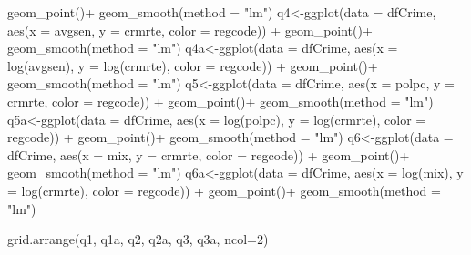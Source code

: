 \documentclass[]{article}
\newenvironment{Shaded}{}{}
\newcommand{\DataTypeTok}[1]{#1}
\newcommand{\DecValTok}[1]{#1}
\newcommand{\KeywordTok}[1]{\textcolor[rgb]{0.00,0.00,1.00}{#1}}
\newcommand{\NormalTok}[1]{#1}
\newcommand{\OperatorTok}[1]{#1}
\newcommand{\StringTok}[1]{\textcolor[rgb]{0.00,0.50,0.50}{#1}}
\begin{document}
\begin{Shaded}
\begin{Highlighting}[]
\StringTok{      }\KeywordTok{geom_point}\NormalTok{()}\OperatorTok{+}
\StringTok{  }\KeywordTok{geom_smooth}\NormalTok{(}\DataTypeTok{method =} \StringTok{"lm"}\NormalTok{)}
\NormalTok{q4<-}\KeywordTok{ggplot}\NormalTok{(}\DataTypeTok{data =}\NormalTok{ dfCrime, }\KeywordTok{aes}\NormalTok{(}\DataTypeTok{x =}\NormalTok{ avgsen, }\DataTypeTok{y =}\NormalTok{ crmrte, }\DataTypeTok{color =}\NormalTok{ regcode)) }\OperatorTok{+}
\StringTok{      }\KeywordTok{geom_point}\NormalTok{()}\OperatorTok{+}
\StringTok{  }\KeywordTok{geom_smooth}\NormalTok{(}\DataTypeTok{method =} \StringTok{"lm"}\NormalTok{)}
\NormalTok{q4a<-}\KeywordTok{ggplot}\NormalTok{(}\DataTypeTok{data =}\NormalTok{ dfCrime, }\KeywordTok{aes}\NormalTok{(}\DataTypeTok{x =} \KeywordTok{log}\NormalTok{(avgsen), }\DataTypeTok{y =} \KeywordTok{log}\NormalTok{(crmrte), }\DataTypeTok{color =}\NormalTok{ regcode)) }\OperatorTok{+}
\StringTok{      }\KeywordTok{geom_point}\NormalTok{()}\OperatorTok{+}
\StringTok{  }\KeywordTok{geom_smooth}\NormalTok{(}\DataTypeTok{method =} \StringTok{"lm"}\NormalTok{)}
\NormalTok{q5<-}\KeywordTok{ggplot}\NormalTok{(}\DataTypeTok{data =}\NormalTok{ dfCrime, }\KeywordTok{aes}\NormalTok{(}\DataTypeTok{x =}\NormalTok{ polpc, }\DataTypeTok{y =}\NormalTok{ crmrte, }\DataTypeTok{color =}\NormalTok{ regcode)) }\OperatorTok{+}
\StringTok{      }\KeywordTok{geom_point}\NormalTok{()}\OperatorTok{+}
\StringTok{  }\KeywordTok{geom_smooth}\NormalTok{(}\DataTypeTok{method =} \StringTok{"lm"}\NormalTok{)}
\NormalTok{q5a<-}\KeywordTok{ggplot}\NormalTok{(}\DataTypeTok{data =}\NormalTok{ dfCrime, }\KeywordTok{aes}\NormalTok{(}\DataTypeTok{x =} \KeywordTok{log}\NormalTok{(polpc), }\DataTypeTok{y =} \KeywordTok{log}\NormalTok{(crmrte), }\DataTypeTok{color =}\NormalTok{ regcode)) }\OperatorTok{+}
\StringTok{      }\KeywordTok{geom_point}\NormalTok{()}\OperatorTok{+}
\StringTok{  }\KeywordTok{geom_smooth}\NormalTok{(}\DataTypeTok{method =} \StringTok{"lm"}\NormalTok{)}
\NormalTok{q6<-}\KeywordTok{ggplot}\NormalTok{(}\DataTypeTok{data =}\NormalTok{ dfCrime, }\KeywordTok{aes}\NormalTok{(}\DataTypeTok{x =}\NormalTok{ mix, }\DataTypeTok{y =}\NormalTok{ crmrte, }\DataTypeTok{color =}\NormalTok{ regcode)) }\OperatorTok{+}
\StringTok{      }\KeywordTok{geom_point}\NormalTok{()}\OperatorTok{+}
\StringTok{  }\KeywordTok{geom_smooth}\NormalTok{(}\DataTypeTok{method =} \StringTok{"lm"}\NormalTok{)}
\NormalTok{q6a<-}\KeywordTok{ggplot}\NormalTok{(}\DataTypeTok{data =}\NormalTok{ dfCrime, }\KeywordTok{aes}\NormalTok{(}\DataTypeTok{x =} \KeywordTok{log}\NormalTok{(mix), }\DataTypeTok{y =} \KeywordTok{log}\NormalTok{(crmrte), }\DataTypeTok{color =}\NormalTok{ regcode)) }\OperatorTok{+}
\StringTok{      }\KeywordTok{geom_point}\NormalTok{()}\OperatorTok{+}
\StringTok{  }\KeywordTok{geom_smooth}\NormalTok{(}\DataTypeTok{method =} \StringTok{"lm"}\NormalTok{)}

\KeywordTok{grid.arrange}\NormalTok{(q1, q1a, q2, q2a, q3, q3a, }\DataTypeTok{ncol=}\DecValTok{2}\NormalTok{)}
\end{Highlighting}
\end{Shaded}
\end{document}
